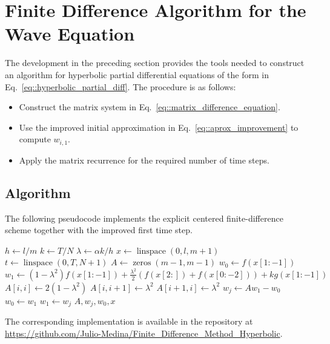 \documentclass[a4paper]{article}
\begin{document}
\section{Finite Difference Algorithm for the Wave Equation}

The development in the preceding section provides the tools needed to construct an algorithm for hyperbolic partial differential equations of the form in Eq.~\ref{eq::hyperbolic_partial_diff}. The procedure is as follows:
\begin{itemize}
\item Construct the matrix system in Eq.~\ref{eq::matrix_difference_equation}.
\item Use the improved initial approximation in Eq.~\ref{eq::aprox_improvement} to compute $w_{i,1}$.
\item Apply the matrix recurrence for the required number of time steps.
\end{itemize}

\subsection{Algorithm}

The following pseudocode implements the explicit centered finite-difference scheme together with the improved first time step.
\begin{algorithm}[H]
\caption{Explicit finite-difference method for the wave equation}\label{alg::finite_difference_hyperbolic}
\begin{algorithmic}[1]
\State $h\gets l/m$
\State $k\gets T/N$
\State $\lambda\gets \alpha k/h$
\State $x\gets \operatorname{linspace}(0,l,m+1)$
\State $t\gets \operatorname{linspace}(0,T,N+1)$
\State $A\gets \operatorname{zeros}(m-1,m-1)$
\State $w_0\gets f(x[1:-1])$
\State $w_1\gets(1-\lambda^2)f(x[1:-1])+\frac{\lambda^2}{2}\left(f(x[2:])+f(x[0:-2])\right)+kg(x[1:-1])$
\State $A[i,i]\gets2(1-\lambda^2)$
\State $A[i,i+1]\gets\lambda^2$
\State $A[i+1,i]\gets\lambda^2$
\EndIf
\EndFor
{}
\State $w_j\gets Aw_1-w_0$
\State $w_0\gets w_1$
\State $w_1\gets w_j$
\EndFor
\State \Return $A,w_j,w_0,x$
\EndFunction
\end{algorithmic}
\end{algorithm}

The corresponding implementation is available in the repository at \url{https://github.com/Julio-Medina/Finite_Difference_Method_Hyperbolic}.
\end{document}
